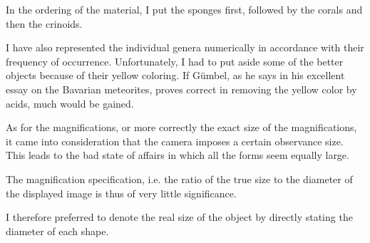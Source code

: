 \documentclass[a4paper, 11pt, oneside]{article}
\begin{document}
In the ordering of the material, I put the sponges first, followed by the corals and then the crinoids.

I have also represented the individual genera numerically in accordance with their frequency of occurrence. Unfortunately, I had to put aside some of the better objects because of their yellow coloring. If Gümbel, as he says in his excellent essay on the Bavarian meteorites, proves correct in removing the yellow color by acids, much would be gained.

As for the magnifications, or more correctly the exact size of the magnifications, it came into consideration that the camera imposes a certain observance size. This leads to the bad state of affairs in which all the forms seem equally large.

The magnification specification, i.e. the ratio of the true size to the diameter of the displayed image is thus of very little significance.

I therefore preferred to denote the real size of the object by directly stating the diameter of each shape.
\clearpage
\end{document}
